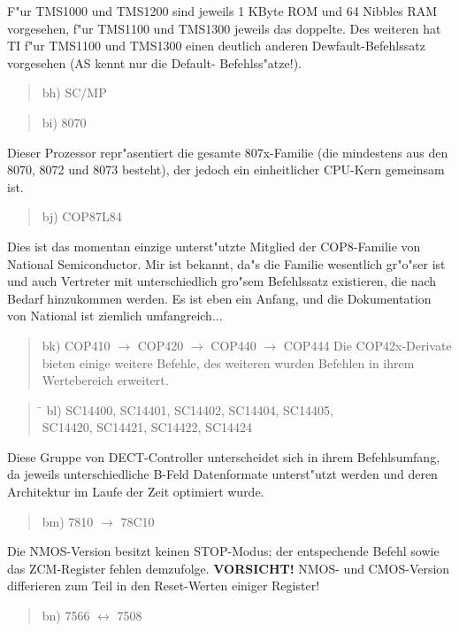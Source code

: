 \documentclass[12pt,a4paper,twoside]{report}
\newcommand{\bb}[1]{{\bf #1}}
\begin{document}
F"ur TMS1000 und TMS1200 sind jeweils 1 KByte ROM und 64 Nibbles
RAM vorgesehen, f"ur TMS1100 und TMS1300 jeweils das doppelte.  Des
weiteren hat TI f"ur TMS1100 und TMS1300 einen deutlich anderen
Dewfault-Befehlssatz vorgesehen (AS kennt nur die Default-
Befehlss"atze!).
\begin{quote}
bh) SC/MP
\end{quote}
\begin{quote}
bi) 8070
\end{quote}
Dieser Prozessor repr"asentiert die gesamte 807x-Familie (die mindestens
aus den 8070, 8072 und 8073 besteht), der jedoch ein einheitlicher
CPU-Kern gemeinsam ist.
\begin{quote}
bj) COP87L84
\end{quote}
Dies ist das momentan einzige unterst"utzte Mitglied der COP8-Familie
von National Semiconductor.  Mir ist bekannt, da"s die Familie
wesentlich gr"o"ser ist und auch Vertreter mit unterschiedlich gro"sem
Befehlssatz existieren, die nach Bedarf hinzukommen werden.  Es ist eben
ein Anfang, und die Dokumentation von National ist ziemlich umfangreich...
\begin{quote}
bk) COP410 $\rightarrow$ COP420 $\rightarrow$ COP440 $\rightarrow$ COP444
Die COP42x-Derivate bieten einige weitere Befehle, des weiteren wurden
Befehlen in ihrem Wertebereich erweitert.
\end{quote}
\begin{quote}
\begin{tabbing}
\hspace{0.7cm} \= \kill
bl) \> SC14400, SC14401, SC14402, SC14404, SC14405, \\
    \> SC14420, SC14421, SC14422, SC14424 \\
\end{tabbing}
\end{quote}
Diese Gruppe von DECT-Controller unterscheidet sich in ihrem
Befehlsumfang, da jeweils unterschiedliche B-Feld Datenformate
unterst"utzt werden und deren Architektur im Laufe der Zeit optimiert
wurde.
\begin{quote}
bm) 7810 $\rightarrow$ 78C10
\end{quote}
Die NMOS-Version besitzt keinen STOP-Modus; der entspechende Befehl sowie
das ZCM-Register fehlen demzufolge.  \bb{VORSICHT!} NMOS- und CMOS-Version
differieren zum Teil in den Reset-Werten einiger Register!
\begin{quote}
bn) 7566 $\leftrightarrow$ 7508
\end{quote}
\end{document}
